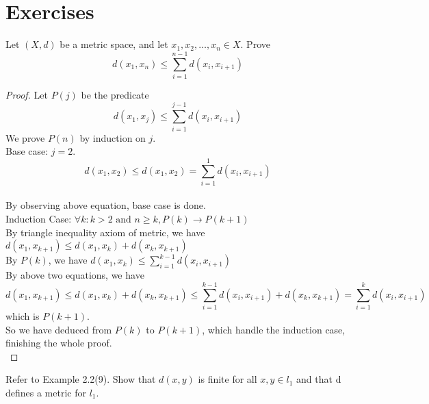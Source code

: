 \documentclass{report}
\begin{document}
\section{Exercises}
\begin{question}{}{}
Let $(X,d)$ be a metric space, and let $x_1,x_2,\dots,x_n \in X$. Prove
\begin{equation}
d(x_1,x_n)\leq \sum_{i=1}^{n-1}d(x_i,x_{i+1})
\end{equation}
\end{question}
\begin{proof}
Let $P(j)$ be the predicate 
\begin{equation}
d(x_1,x_j)\leq \sum_{i=1}^{j-1}d(x_i,x_{i+1})
\end{equation}
We prove $P(n)$ by induction on $j$.\\

Base case: $j=2$. \\
\begin{equation}
d(x_1,x_2)\leq d(x_1,x_2)=\sum_{i=1}^{1}d(x_i,x_{i+1})
\end{equation}\\
By observing above equation, base case is done.\\

Induction Case: $\forall k:k>2\text{ and }n\geq k,P(k)\longrightarrow P(k+1)$ \\

By triangle inequality axiom of metric, we have $d(x_1,x_{k+1})\leq d(x_1,x_k)+d(x_k,x_{k+1})$\\

By $P(k)$, we have $d(x_1,x_k)\leq \sum_{i=1}^{k-1}d(x_i,x_{i+1})$\\

By above two equations, we have
\begin{equation}
d(x_1,x_{k+1})\leq d(x_1,x_k)+d(x_k,x_{k+1})\leq \sum_{i=1}^{k-1}d(x_i,x_{i+1})+d(x_k,x_{k+1})=\sum_{i=1}^k d(x_i,x_{i+1})
\end{equation}
which is $P(k+1)$.\\

So we have deduced from $P(k)$ to $P(k+1)$, which handle the induction case, finishing the whole proof.\\
\end{proof}
\begin{question}{}{}
Refer to Example 2.2(9). Show that $d(x,y)$ is finite for all $x,y \in l_1$ and that d defines a metric for $l_1$.
\end{question}
\end{document}
